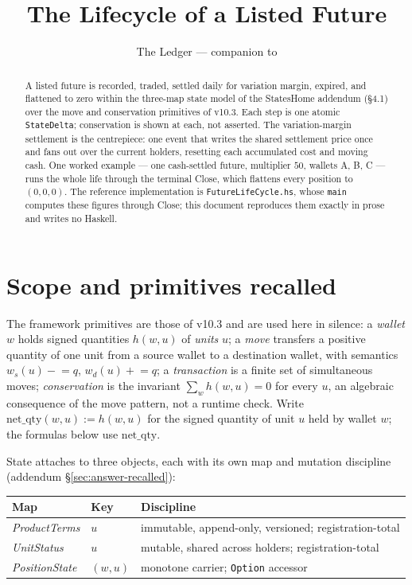 \documentclass[11pt]{article}
\title{The Lifecycle of a Listed Future}
\author{The Ledger --- companion to \code{FutureLifeCycle.hs}}
\date{}
\newcommand{\netq}{\mathrm{net\_qty}}
\newcommand{\code}[1]{\texttt{#1}}
\begin{document}
\maketitle

\begin{abstract}
\noindent A listed future is recorded, traded, settled daily for variation margin, expired, and flattened to
zero within the three-map state model of the StatesHome addendum (\S4.1) over the move and
conservation primitives of v10.3. Each step is one atomic \code{StateDelta}; conservation is shown
at each, not asserted. The variation-margin settlement is the centrepiece: one event that writes the
shared settlement price once and fans out over the current holders, resetting each accumulated cost
and moving cash. One worked example --- one cash-settled future, multiplier $50$, wallets A, B, C
--- runs the whole life through the terminal Close, which flattens every position to $(0,0,0)$. The
reference implementation is \code{FutureLifeCycle.hs}, whose \code{main} computes these figures
through Close; this document reproduces them exactly in prose and writes no Haskell.
\end{abstract}

\section{Scope and primitives recalled}

The framework primitives are those of v10.3 and are used here in silence: a \emph{wallet} $w$ holds
signed quantities $h(w,u)$ of \emph{units} $u$; a \emph{move} transfers a positive quantity of one
unit from a source wallet to a destination wallet, with semantics $w_s(u)\mathrel{-}=q$,
$w_d(u)\mathrel{+}=q$; a \emph{transaction} is a finite set of simultaneous moves;
\emph{conservation} is the invariant $\sum_{w}h(w,u)=0$ for every $u$, an algebraic consequence of
the move pattern, not a runtime check. Write $\netq(w,u):=h(w,u)$ for the signed quantity of unit
$u$ held by wallet $w$; the formulas below use $\netq$.

State attaches to three objects, each with its own map and mutation discipline
(addendum \S\ref{sec:answer-recalled}):

\begin{center}\small
\begin{tabular}{@{}lll@{}}
\toprule
Map & Key & Discipline \\
\midrule
\emph{ProductTerms}  & $u$            & immutable, append-only, versioned; registration-total \\
\emph{UnitStatus}    & $u$            & mutable, shared across holders; registration-total \\
\emph{PositionState} & $(w,u)$        & monotone carrier; \code{Option} accessor \\
\bottomrule
\end{tabular}
\end{center}
\label{sec:answer-recalled}
\end{document}
